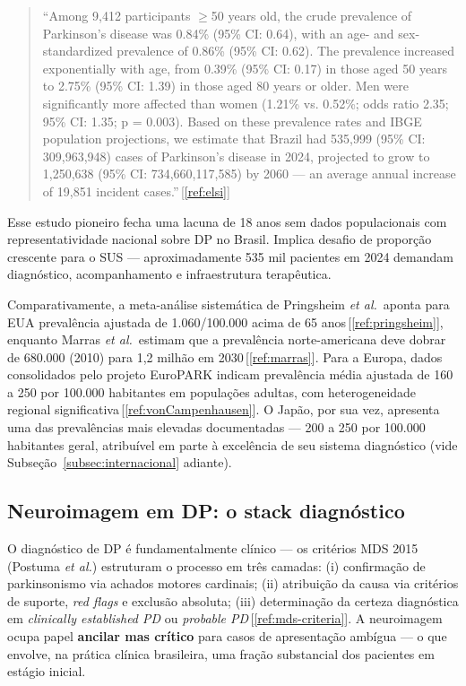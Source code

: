 \documentclass[12pt,a4paper,oneside]{article}
\begin{document}
\begin{quotation}
\noindent\small
``Among 9,412 participants $\geq$50 years old, the crude
prevalence of Parkinson's disease was 0.84\% (95\% CI:
0.64), with an age- and sex-standardized prevalence
of 0.86\% (95\% CI: 0.62). The prevalence increased
exponentially with age, from 0.39\% (95\% CI: 0.17)
in those aged 50 years to 2.75\% (95\% CI:
1.39) in those aged 80 years or older. Men were
significantly more affected than women (1.21\% vs. 0.52\%; odds
ratio 2.35; 95\% CI: 1.35; p = 0.003). Based on
these prevalence rates and IBGE population projections, we estimate
that Brazil had 535,999 (95\% CI: 309,963,948) cases
of Parkinson's disease in 2024, projected to grow to 1,250,638
(95\% CI: 734,660,117,585) by 2060 — an average annual
increase of 19,851 incident cases.''\,[\ref{ref:elsi}]
\end{quotation}

Esse estudo pioneiro fecha uma lacuna de 18 anos sem dados
populacionais com representatividade nacional sobre DP no Brasil.
Implica desafio de proporção crescente para o SUS — aproximadamente
535 mil pacientes em 2024 demandam diagnóstico, acompanhamento e
infraestrutura terapêutica.

Comparativamente, a meta-análise sistemática de Pringsheim
\textit{et al.}\ aponta para EUA prevalência ajustada de
1.060/100.000 acima de 65 anos\,[\ref{ref:pringsheim}], enquanto
Marras \textit{et al.}\ estimam que a prevalência norte-americana
deve dobrar de 680.000 (2010) para 1,2 milhão em
2030\,[\ref{ref:marras}]. Para a Europa, dados consolidados pelo
projeto EuroPARK indicam prevalência média ajustada de 160 a 250
por 100.000 habitantes em populações adultas, com
heterogeneidade regional significativa\,[\ref{ref:vonCampenhausen}].
O Japão, por sua vez, apresenta uma das prevalências mais elevadas
documentadas — 200 a 250 por 100.000 habitantes geral, atribuível
em parte à excelência de seu sistema diagnóstico (vide
Subseção~\ref{subsec:internacional} adiante).

\subsection{Neuroimagem em DP: o stack diagnóstico}\label{subsec:stack}

O diagnóstico de DP é fundamentalmente clínico — os critérios MDS
2015 (Postuma \textit{et al.}) estruturam o processo em três
camadas: (i) confirmação de parkinsonismo via achados motores
cardinais; (ii) atribuição da causa via critérios de suporte,
\textit{red flags} e exclusão absoluta; (iii) determinação da
certeza diagnóstica em \textit{clinically established PD} ou
\textit{probable PD}\,[\ref{ref:mds-criteria}]. A neuroimagem ocupa
papel \textbf{ancilar mas crítico} para casos de apresentação
ambígua — o que envolve, na prática clínica brasileira, uma fração
substancial dos pacientes em estágio inicial.
\end{document}

